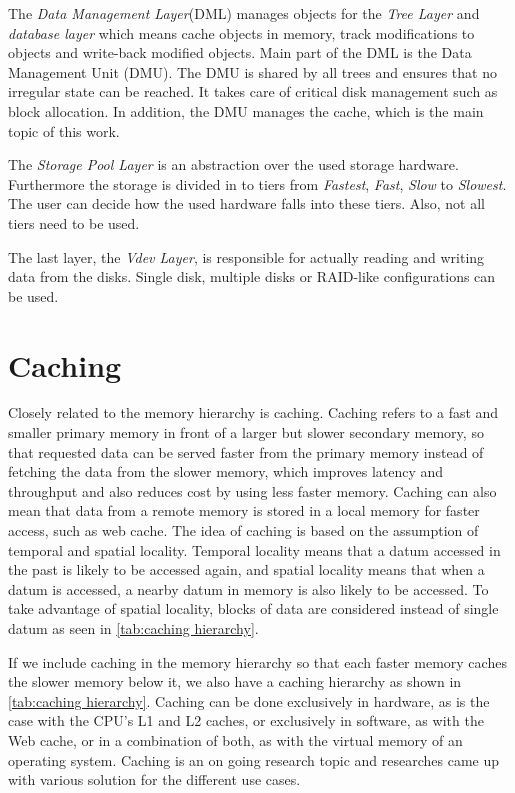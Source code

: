 \documentclass[
	12pt,
	a4paper,
	abstract,
	bibliography=totoc,
	chapterprefix,
	headings=openright,
	numbers=endperiod,
	parskip=half,
	twoside,
]{scrreprt}
\begin{document}
The \emph{Data Management Layer}(DML) manages objects for the \emph{Tree Layer} and \emph{database layer} which means cache objects in memory, 
track modifications to objects and write-back modified objects.
Main part of the DML is the Data Management Unit (DMU).
The DMU is shared by all trees and ensures that no irregular state can be reached.
It takes care of critical disk management such as block allocation.
In addition, the DMU manages the cache, which is the main topic of this work.

The \emph{Storage Pool Layer} is an abstraction over the used storage hardware.
Furthermore the storage is divided in to tiers from \emph{Fastest}, \emph{Fast}, \emph{Slow} to \emph{Slowest}.
The user can decide how the used hardware falls into these tiers. Also, not all tiers need to be used.

The last layer, the \emph{Vdev Layer}, is responsible for actually reading and writing data from the disks.
Single disk, multiple disks or RAID-like configurations can be used.

\section{Caching}

Closely related to the memory hierarchy is caching.
Caching refers to a fast and smaller primary memory in front of a larger but slower secondary memory, so that requested data can be served faster from the primary memory instead of fetching the data from the slower memory, which improves latency and throughput and also reduces cost by using less faster memory.
Caching can also mean that data from a remote memory is stored in a local memory for faster access, such as web cache.
The idea of caching is based on the assumption of temporal and spatial locality.
Temporal locality means that a datum accessed in the past is likely to be accessed again, and
spatial locality means that when a datum is accessed, a nearby datum in memory is also likely to be accessed.
To take advantage of spatial locality, blocks of data are considered instead of single datum as seen in \ref{tab:caching hierarchy}.

If we include caching in the memory hierarchy so that each faster memory caches the slower memory below it, we also have a caching hierarchy as shown in \ref{tab:caching hierarchy}.
Caching can be done exclusively in hardware, as is the case with the CPU's L1 and L2 caches, or exclusively in software, as with the Web cache, or in a combination of both, as with the virtual memory of an operating system.
Caching is an on going research topic and researches came up with various solution for the different use cases.
\end{document}
